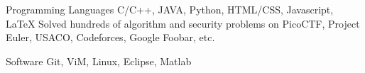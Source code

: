 

\begin{cvskills}

  \cvskill
    {Programming Languages} %
    {C/C++, JAVA, Python, HTML/CSS, Javascript, LaTeX \newline
    Solved hundreds of algorithm and security problems on PicoCTF, Project Euler, USACO, Codeforces, Google Foobar, etc.} %

 \cvskill
    {Software} %
    {Git, ViM, Linux, Eclipse, Matlab} %

%
%
%
%



\end{cvskills}
